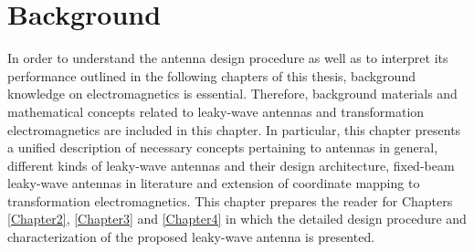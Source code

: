 
\chapter{Background} %
\label{Chapter1} 
In order to understand the antenna design procedure as well as to interpret its performance outlined in the following chapters of this thesis, background knowledge on electromagnetics is essential. Therefore, background materials and mathematical concepts related to leaky-wave antennas and transformation electromagnetics are included in this chapter. In particular, this chapter presents a unified description of necessary concepts pertaining to antennas in general, different kinds of leaky-wave antennas and their design architecture, fixed-beam leaky-wave antennas in literature and extension of coordinate mapping to transformation electromagnetics. This chapter prepares the reader for Chapters \ref{Chapter2}, \ref{Chapter3} and \ref{Chapter4} in which the detailed design procedure and characterization of the proposed leaky-wave antenna is presented. 

